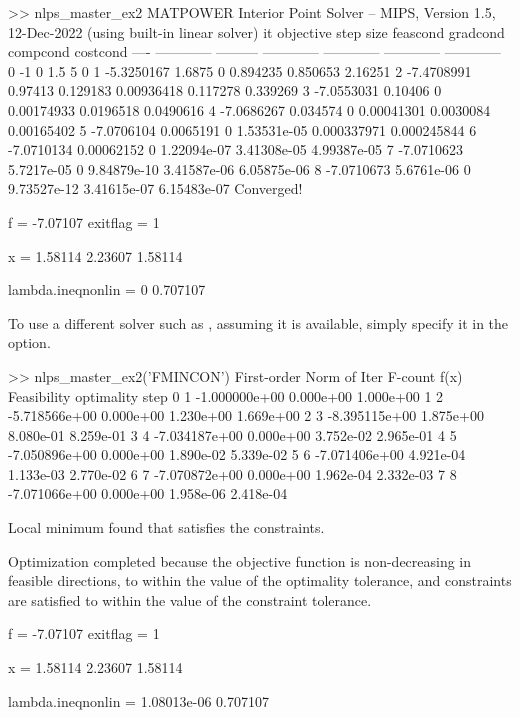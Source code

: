 \documentclass[12pt]{article}
\newcommand{\code}[1]{{\relsize{-0.5}{\tt{{#1}}}}}  %
\numberwithin{equation}{section}
\numberwithin{table}{section}
\numberwithin{figure}{section}
\begin{document}
\begin{Code}
>> nlps_master_ex2
MATPOWER Interior Point Solver -- MIPS, Version 1.5, 12-Dec-2022
 (using built-in linear solver)
 it    objective   step size   feascond     gradcond     compcond     costcond  
----  ------------ --------- ------------ ------------ ------------ ------------
  0            -1                       0          1.5            5            0
  1    -5.3250167     1.6875            0     0.894235     0.850653      2.16251
  2    -7.4708991    0.97413     0.129183   0.00936418     0.117278     0.339269
  3    -7.0553031    0.10406            0   0.00174933    0.0196518    0.0490616
  4    -7.0686267   0.034574            0   0.00041301    0.0030084   0.00165402
  5    -7.0706104  0.0065191            0  1.53531e-05  0.000337971  0.000245844
  6    -7.0710134 0.00062152            0  1.22094e-07  3.41308e-05  4.99387e-05
  7    -7.0710623 5.7217e-05            0  9.84879e-10  3.41587e-06  6.05875e-06
  8    -7.0710673 5.6761e-06            0  9.73527e-12  3.41615e-07  6.15483e-07
Converged!

f = -7.07107   exitflag = 1

x = 
   1.58114
   2.23607
   1.58114

lambda.ineqnonlin =
   0
   0.707107
\end{Code}
To use a different solver such as \code{fmincon}, assuming it is available, simply specify it in the \code{alg} option.
\begin{Code}
>> nlps_master_ex2('FMINCON')
                                            First-order      Norm of
 Iter F-count            f(x)  Feasibility   optimality         step
    0       1   -1.000000e+00    0.000e+00    1.000e+00
    1       2   -5.718566e+00    0.000e+00    1.230e+00    1.669e+00
    2       3   -8.395115e+00    1.875e+00    8.080e-01    8.259e-01
    3       4   -7.034187e+00    0.000e+00    3.752e-02    2.965e-01
    4       5   -7.050896e+00    0.000e+00    1.890e-02    5.339e-02
    5       6   -7.071406e+00    4.921e-04    1.133e-03    2.770e-02
    6       7   -7.070872e+00    0.000e+00    1.962e-04    2.332e-03
    7       8   -7.071066e+00    0.000e+00    1.958e-06    2.418e-04

Local minimum found that satisfies the constraints.

Optimization completed because the objective function is non-decreasing in 
feasible directions, to within the value of the optimality tolerance,
and constraints are satisfied to within the value of the constraint tolerance.


f = -7.07107   exitflag = 1

x = 
   1.58114
   2.23607
   1.58114

lambda.ineqnonlin =
   1.08013e-06
   0.707107
\end{Code}
\end{document}
